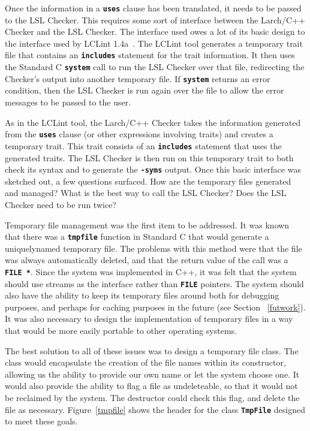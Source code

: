 \documentclass[12pt]{article} %
\newcommand{\reserved}[1]{\textbf{\texttt{#1}}} %
\begin{document}
Once the information in a \reserved{uses} clause has been translated,
it needs to be passed to the LSL Checker. This requires some sort of
interface between the Larch/C++ Checker and the LSL Checker. The
interface used owes a lot of its basic design to the interface used by
LCLint 1.4a~\cite{lclint}. The LCLint tool generates a temporary trait
file that contains an \reserved{includes} statement for the trait
information. It then uses the Standard C \reserved{system} call to run
the LSL Checker over that file, redirecting the Checker's output into another
temporary file. If \reserved{system} returns an error condition, then the LSL
Checker is run again over the file to allow the error messages to be
passed to the user.

As in the LCLint tool, the Larch/C++ Checker takes the
information generated from the \reserved{uses} clause (or other expressions
involving traits) and creates a temporary trait. This trait consists
of an
\reserved{includes} statement that uses the generated traits. The LSL
Checker is then run on this temporary trait to both check its syntax and to
generate the \reserved{-syms} output. Once this basic interface 
was sketched out, a few questions surfaced. How are the temporary
files generated and managed? What is the best way to call the LSL
Checker? Does the LSL Checker need to be run twice?

Temporary file management was the first item to be addressed. It was
known that there was a \reserved{tmpfile} function in Standard C that
would generate a uniquely\-named temporary file. The problems with this method
were that the file was always automatically deleted, and that the
return value of the call was a \reserved{FILE *}. Since the system was
implemented in C++, it was felt that the system should use streams as
the interface rather than \reserved{FILE} pointers. The system should
also have the ability to keep its temporary files around both for
debugging purposes, and perhaps for caching purposes in the future
(see Section ~\ref{futwork}). It was also necessary to design the
implementation of temporary files in a way that would be more easily
portable to other operating systems.

The best solution to all of these issues was to design a temporary
file class. The class would encapsulate the creation of the file names
within its constructor, allowing us the ability to provide our own
name or let the system choose one. It would also provide the ability
to flag a file as undeleteable, so that it would not be reclaimed by
the system. The destructor could check this flag, and delete the file
as necessary. Figure~\ref{tmpfile} shows the header for the class
\reserved{TmpFile} designed to meet these goals.
\end{document}
